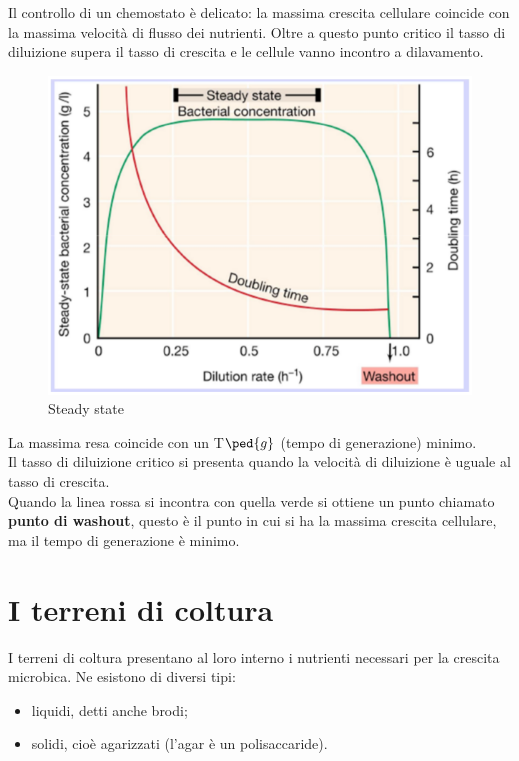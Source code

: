 \documentclass[11pt]{book}
\begin{document}
Il controllo di un chemostato è delicato: la massima crescita cellulare coincide con la massima velocità di flusso dei nutrienti. Oltre a questo punto critico il tasso di diluizione supera il tasso di crescita e le cellule vanno incontro a dilavamento.

\begin{figure}[htp]
\centering
\includegraphics[scale=0.5]{img/DIlavamento.png}
\caption{Steady state}
\label{}
\end{figure}

La massima resa coincide con un T$\ped{g}$ (tempo di generazione) minimo.\\	
Il tasso di diluizione critico si presenta quando la velocità di diluizione è uguale al tasso di crescita.\\
Quando la linea rossa si incontra con quella verde si ottiene un punto chiamato \textbf{punto di washout}, questo è il punto in cui si ha la massima crescita cellulare, ma il tempo di generazione è minimo. 

\clearpage

\section{I terreni di coltura}
I terreni di coltura presentano al loro interno i nutrienti necessari per la crescita microbica.
Ne esistono di diversi tipi: 
\begin{itemize}
\item liquidi, detti anche brodi;
\item solidi, cioè agarizzati (l'agar è un polisaccaride).
\end{itemize}
\end{document}

